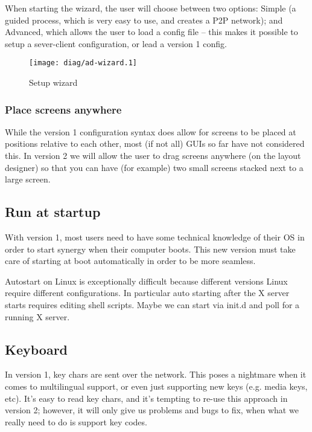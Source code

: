 When starting the wizard, the user will choose between two options: Simple (a
guided process, which is very easy to use, and creates a P2P network); and
Advanced, which allows the user to load a config file -- this makes it possible
to setup a sever-client configuration, or lead a version 1 config.

\begin{figure}[ht!]
  \centering
  \texttt{[image: diag/ad-wizard.1]}
  \caption{Setup wizard}
  \label{fig:setupWizard}
\end{figure}

\subsubsection{Place screens anywhere}

While the version 1 configuration syntax does allow for screens to be placed at
positions relative to each other, most (if not all) GUIs so far have not 
considered this. In version 2 we will allow the user to drag screens anywhere
(on the layout designer) so that you can have (for example) two small screens
stacked next to a large screen.

\subsection{Run at startup}

With version 1, most users need to have some technical knowledge of their OS
in order to start synergy when their computer boots. This new version must
take care of starting at boot automatically in order to be more seamless.

Autostart on Linux is exceptionally difficult because different versions Linux 
require different configurations. In particular auto starting after the X server
starts requires editing shell scripts. Maybe we can start via init.d and poll 
for a running X server.

\subsection{Keyboard}

In version 1, key chars are sent over the network. This poses a nightmare when
it comes to multilingual support, or even just supporting new keys (e.g. media
keys, etc). It's easy to read key chars, and it's tempting to re-use this 
approach in version 2; however, it will only give us problems and bugs to fix,
when what we really need to do is support key codes.

